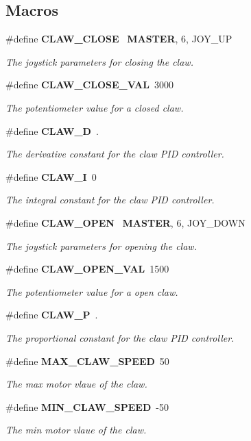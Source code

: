 \subsection*{Macros}
\begin{DoxyCompactItemize}
\item 
\#define \textbf{ C\+L\+A\+W\+\_\+\+C\+L\+O\+SE}~\textbf{ M\+A\+S\+T\+ER}, 6, J\+O\+Y\+\_\+\+UP
\begin{DoxyCompactList}\small\item\em The joystick parameters for closing the claw. \end{DoxyCompactList}\item 
\#define \textbf{ C\+L\+A\+W\+\_\+\+C\+L\+O\+S\+E\+\_\+\+V\+AL}~3000
\begin{DoxyCompactList}\small\item\em The potentiometer value for a closed claw. \end{DoxyCompactList}\item 
\#define \textbf{ C\+L\+A\+W\+\_\+D}~.
\begin{DoxyCompactList}\small\item\em The derivative constant for the claw P\+ID controller. \end{DoxyCompactList}\item 
\#define \textbf{ C\+L\+A\+W\+\_\+I}~0
\begin{DoxyCompactList}\small\item\em The integral constant for the claw P\+ID controller. \end{DoxyCompactList}\item 
\#define \textbf{ C\+L\+A\+W\+\_\+\+O\+P\+EN}~\textbf{ M\+A\+S\+T\+ER}, 6, J\+O\+Y\+\_\+\+D\+O\+WN
\begin{DoxyCompactList}\small\item\em The joystick parameters for opening the claw. \end{DoxyCompactList}\item 
\#define \textbf{ C\+L\+A\+W\+\_\+\+O\+P\+E\+N\+\_\+\+V\+AL}~1500
\begin{DoxyCompactList}\small\item\em The potentiometer value for a open claw. \end{DoxyCompactList}\item 
\#define \textbf{ C\+L\+A\+W\+\_\+P}~.
\begin{DoxyCompactList}\small\item\em The proportional constant for the claw P\+ID controller. \end{DoxyCompactList}\item 
\#define \textbf{ M\+A\+X\+\_\+\+C\+L\+A\+W\+\_\+\+S\+P\+E\+ED}~50
\begin{DoxyCompactList}\small\item\em The max motor vlaue of the claw. \end{DoxyCompactList}\item 
\#define \textbf{ M\+I\+N\+\_\+\+C\+L\+A\+W\+\_\+\+S\+P\+E\+ED}~-\/50
\begin{DoxyCompactList}\small\item\em The min motor vlaue of the claw. \end{DoxyCompactList}\end{DoxyCompactItemize}
